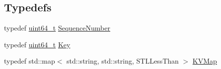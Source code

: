 \subsection*{Typedefs}
\begin{DoxyCompactItemize}
\item 
typedef \hyperlink{stdint_8h_aaa5d1cd013383c889537491c3cfd9aad}{uint64\+\_\+t} \hyperlink{namespaceleveldb_a5481ededd221c36d652c371249f869fa}{Sequence\+Number}
\item 
typedef \hyperlink{stdint_8h_aaa5d1cd013383c889537491c3cfd9aad}{uint64\+\_\+t} \hyperlink{namespaceleveldb_a7e9a9725b13fa0bd922d885280dfab95}{Key}
\item 
typedef std\+::map$<$ std\+::string, std\+::string, S\+T\+L\+Less\+Than $>$ \hyperlink{namespaceleveldb_aac1e50450147be263e08252c6700f7a7}{K\+V\+Map}
\end{DoxyCompactItemize}
